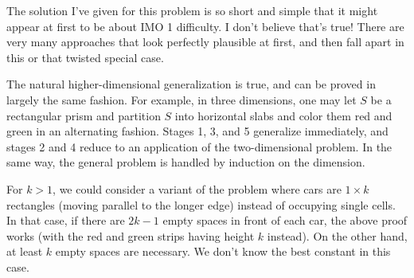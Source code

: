 \begin{remark*}
  The solution I've given for this problem is so short
  and simple that it might appear at first
  to be about IMO 1 difficulty. I don't believe that's true!
  There are very many approaches that look perfectly plausible at first,
  and then fall apart in this or that twisted special case.
\end{remark*}

\begin{remark*}
  The natural higher-dimensional generalization
  is true, and can be proved in largely the same fashion.
  For example, in three dimensions,
  one may let $S$ be a rectangular prism
  and partition $S$ into horizontal slabs
  and color them red and green in an alternating fashion.
  Stages 1, 3, and 5 generalize immediately,
  and stages 2 and 4 reduce to an application of the two-dimensional problem.
  In the same way, the general problem is handled by induction on the dimension.
\end{remark*}

\begin{remark*}
  For $k > 1$, we could consider a variant of the problem
  where cars are $1 \times k$ rectangles (moving parallel to the longer edge)
  instead of occupying single cells.
  In that case, if there are $2k-1$ empty spaces in front of each car,
  the above proof works
  (with the red and green strips having height $k$ instead).
  On the other hand, at least $k$ empty spaces are necessary.
  We don't know the best constant in this case.
\end{remark*}
